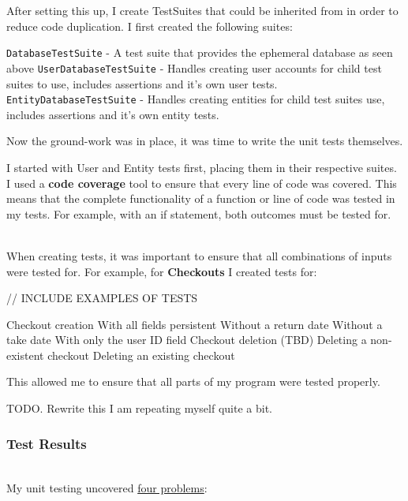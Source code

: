 \documentclass[../../main.tex]{subfiles}
\begin{document}
\noindent After setting this up, I create TestSuites that could be inherited from in order to reduce code duplication. I first created the following suites:

\begin{outline}
    \1 \lstinline{DatabaseTestSuite} - A test suite that provides the ephemeral database as seen above
    \2 \lstinline{UserDatabaseTestSuite} - Handles creating user accounts for child test suites to use, includes assertions and it's own user tests.
    \2 \lstinline{EntityDatabaseTestSuite} - Handles creating entities for child test suites use, includes assertions and it's own entity tests.
\end{outline}

\noindent Now the ground-work was in place, it was time to write the unit tests themselves.

\noindent I started with User and Entity tests first, placing them in their respective suites.
I used a \textbf{code coverage} tool to ensure that every line of code was covered.
This means that the complete functionality of a function or line of code was tested in my tests.
For example, with an if statement, both outcomes must be tested for.

\noindent \\ When creating tests, it was important to ensure that all combinations of inputs were tested for.
For example, for \textbf{Checkouts} I created tests for:

// INCLUDE EXAMPLES OF TESTS

\begin{outline}
    \1 Checkout creation
    \2 With all fields persistent
    \2 Without a return date
    \2 Without a take date
    \2 With only the user ID field
    \1 Checkout deletion (TBD)
    \2 Deleting a non-existent checkout
    \2 Deleting an existing checkout
\end{outline}

\noindent This allowed me to ensure that all parts of my program were tested properly.

\noindent TODO. Rewrite this I am repeating myself quite a bit.


\subsubsection{Test Results}

\noindent \\ My unit testing uncovered \underline{four problems}:
\end{document}
